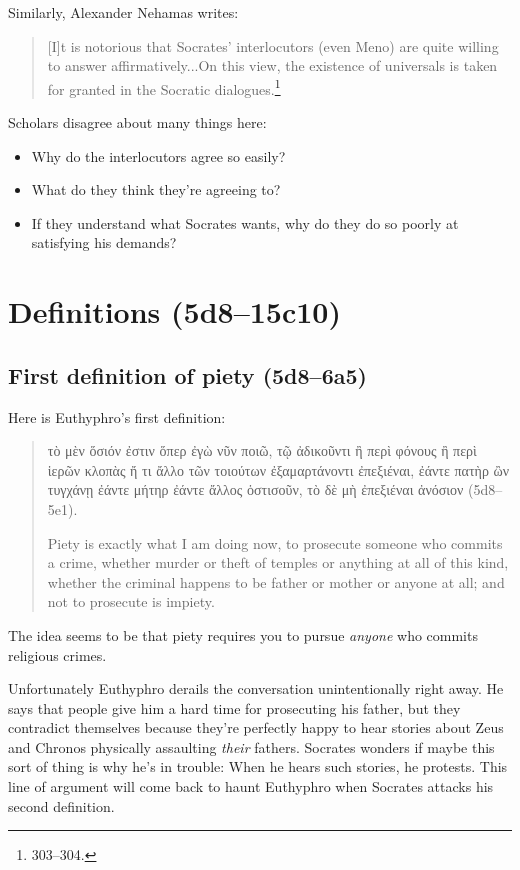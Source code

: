 \documentclass[11pt]{article}
\begin{document}
Similarly, Alexander Nehamas writes:

\begin{quote}
    [I]t is notorious that Socrates' interlocutors (even Meno) are quite willing to answer affirmatively...On this view, the existence of universals is taken for granted in the Socratic dialogues.\footnote{\citet{nehamas1975} 303--304.}
\end{quote}

Scholars disagree about many things here:

\begin{itemize}
    \item Why do the interlocutors agree so easily?
    \item What do they think they're agreeing to?
    \item If they understand what Socrates wants, why do they do so poorly at satisfying his demands?
\end{itemize}


\section{Definitions (5d8--15c10)}

\subsection{First definition of piety (5d8--6a5)}

Here is Euthyphro's first definition:

\begin{quote}
    {\g τὸ μὲν ὅσιόν ἐστιν ὅπερ ἐγὼ νῦν ποιῶ, τῷ ἀδικοῦντι ἢ περὶ φόνους ἢ περὶ ἱερῶν κλοπὰς ἤ τι ἄλλο τῶν τοιούτων ἐξαμαρτάνοντι ἐπεξιέναι, ἐάντε πατὴρ ὢν τυγχάνῃ ἐάντε μήτηρ ἐάντε ἄλλος ὁστισοῦν, τὸ δὲ μὴ ἐπεξιέναι ἀνόσιον} (5d8--5e1).

    Piety is exactly what I am doing now, to prosecute someone who commits a crime, whether murder or theft of temples or anything at all of this kind, whether the criminal happens to be father or mother or anyone at all; and not to prosecute is impiety.
\end{quote}

The idea seems to be that piety requires you to pursue \emph{anyone} who commits religious crimes.

Unfortunately Euthyphro derails the conversation unintentionally right away.  He says that people give him a hard time for prosecuting his father, but they contradict themselves because they're perfectly happy to hear stories about Zeus and Chronos physically assaulting \emph{their} fathers.  Socrates wonders if maybe this sort of thing is why he's in trouble: When he hears such stories, he protests.  This line of argument will come back to haunt Euthyphro when Socrates attacks his second definition.
\end{document}
